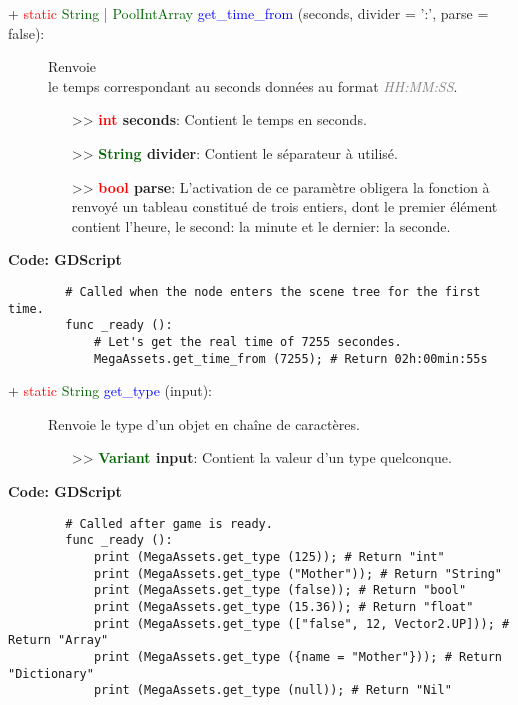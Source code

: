 \documentclass[a4paper, 11pt]{article}
\begin{document}
	\begin{description}
		\item [+ \textcolor{red}{static} \textcolor{darkgreen}{String | PoolIntArray} \textcolor{blue}
		{get\_time\_from} (seconds, divider = ':', parse = false):] Renvoie \\le temps correspondant au 
		seconds données au format \textit{\textcolor{gray}{HH:MM:SS}}.
		\begin{itemize}
			\item [>> \textbf{\textcolor{red}{int} seconds}:] Contient le temps en seconds.
			\item [>> \textbf{\textcolor{darkgreen}{String} divider}:] Contient le séparateur à utilisé.
			\item [>> \textbf{\textcolor{red}{bool} parse}:] L'activation de ce paramètre obligera la 
			fonction à renvoyé un tableau constitué de trois entiers, dont le premier élément contient 
			l'heure, le second: la minute et le dernier: la seconde.\\
		\end{itemize}
	\end{description}
	\textbf{Code: GDScript}
	\begin{lstlisting}
		# Called when the node enters the scene tree for the first time.
		func _ready ():
			# Let's get the real time of 7255 secondes.
			MegaAssets.get_time_from (7255); # Return 02h:00min:55s
	\end{lstlisting}
	\newpage \begin{description}
		\item [+ \textcolor{red}{static} \textcolor{darkgreen}{String} \textcolor{blue}{get\_type} (input):] 
		Renvoie le type d'un objet en chaîne de caractères.
		\begin{itemize}
			\item [>> \textbf{\textcolor{darkgreen}{Variant} input}:] Contient la valeur d'un type
			quelconque.\\
		\end{itemize}
	\end{description}
	\textbf{Code: GDScript}
	\begin{lstlisting}
		# Called after game is ready.
		func _ready ():
			print (MegaAssets.get_type (125)); # Return "int"
			print (MegaAssets.get_type ("Mother")); # Return "String"
			print (MegaAssets.get_type (false)); # Return "bool"
			print (MegaAssets.get_type (15.36)); # Return "float"
			print (MegaAssets.get_type (["false", 12, Vector2.UP])); # Return "Array"
			print (MegaAssets.get_type ({name = "Mother"})); # Return "Dictionary"
			print (MegaAssets.get_type (null)); # Return "Nil"
	\end{lstlisting}
\end{document}
